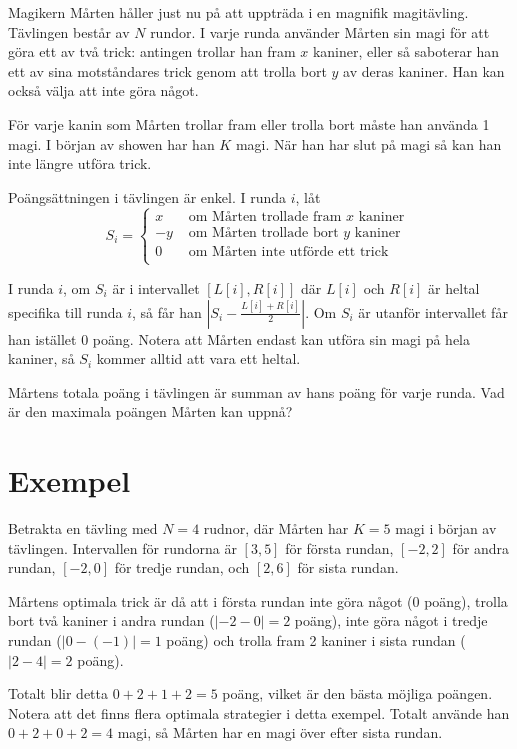 \newcommand\version{v2}
Magikern Mårten håller just nu på att uppträda i en magnifik magitävling.
Tävlingen består av $N$ rundor.
I varje runda använder Mårten sin magi för att göra ett av två trick: antingen trollar
han fram $x$ kaniner, eller så saboterar han ett av sina motståndares trick genom att
trolla bort $y$ av deras kaniner. Han kan också välja att inte göra något.

För varje kanin som Mårten trollar fram eller trolla bort måste han använda 1 magi.
I början av showen har han $K$ magi. När han har slut på magi så kan han inte längre
utföra trick.

Poängsättningen i tävlingen är enkel. I runda $i$, låt
\[ S_i = \begin{cases}
  x & \text{ om Mårten trollade fram $x$ kaniner } \\
  -y & \text{ om Mårten trollade bort $y$ kaniner } \\
  0 & \text{ om Mårten inte utförde ett trick } \\
\end{cases}
\]

I runda $i$, om $S_i$ är i intervallet $[L[i], R[i]]$ där $L[i]$ och $R[i]$ är heltal specifika
till runda $i$, så får han $|S_i - \frac{L[i] + R[i]}{2}|$. Om $S_i$ är utanför intervallet
får han istället $0$ poäng. Notera att Mårten endast kan utföra sin magi på hela kaniner,
så $S_i$ kommer alltid att vara ett heltal.

Mårtens totala poäng i tävlingen är summan av hans poäng för varje runda.
Vad är den maximala poängen Mårten kan uppnå?

\section*{Exempel}
Betrakta en tävling med $N = 4$ rudnor, där Mårten har $K = 5$ magi i början av tävlingen.
Intervallen för rundorna är $[3, 5]$ för första rundan, $[-2, 2]$ för andra rundan, $[-2, 0]$ för tredje rundan,
och $[2, 6]$ för sista rundan.

Mårtens optimala trick är då att i första rundan inte göra något ($0$ poäng), trolla bort två kaniner i andra rundan ($|-2 - 0 | = 2$ poäng),
inte göra något i tredje rundan ($|0 - (-1)| = 1$ poäng) och trolla fram 2 kaniner i sista rundan ($|2 - 4| = 2$ poäng).

Totalt blir detta $0 + 2 + 1 + 2 = 5$ poäng, vilket är den bästa möjliga poängen. Notera att det finns flera optimala strategier i detta exempel.
Totalt använde han $0 + 2 + 0 + 2 = 4$ magi, så Mårten har en magi över efter sista rundan.


